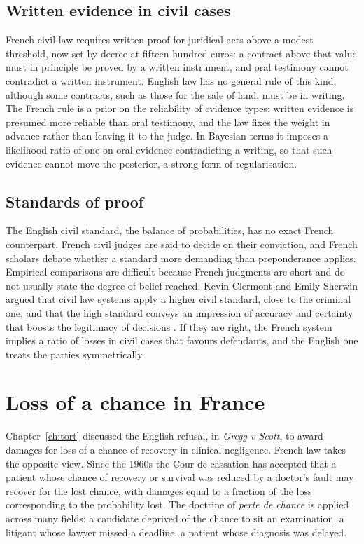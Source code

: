 \subsection{Written evidence in civil cases}

French civil law requires written proof for juridical acts above a modest threshold, now set by decree at fifteen hundred euros: a contract above that value must in principle be proved by a written instrument, and oral testimony cannot contradict a written instrument. English law has no general rule of this kind, although some contracts, such as those for the sale of land, must be in writing. The French rule is a prior on the reliability of evidence types: written evidence is presumed more reliable than oral testimony, and the law fixes the weight in advance rather than leaving it to the judge. In Bayesian terms it imposes a likelihood ratio of one on oral evidence contradicting a writing, so that such evidence cannot move the posterior, a strong form of regularisation.

\subsection{Standards of proof}

The English civil standard, the balance of probabilities, has no exact French counterpart. French civil judges are said to decide on their conviction, and French scholars debate whether a standard more demanding than preponderance applies. Empirical comparisons are difficult because French judgments are short and do not usually state the degree of belief reached. Kevin Clermont and Emily Sherwin argued that civil law systems apply a higher civil standard, close to the criminal one, and that the high standard conveys an impression of accuracy and certainty that boosts the legitimacy of decisions \citep{clermont2002}. If they are right, the French system implies a ratio of losses in civil cases that favours defendants, and the English one treats the parties symmetrically.

\section{Loss of a chance in France}

Chapter~\ref{ch:tort} discussed the English refusal, in \emph{Gregg v Scott}, to award damages for loss of a chance of recovery in clinical negligence. French law takes the opposite view. Since the 1960s the Cour de cassation has accepted that a patient whose chance of recovery or survival was reduced by a doctor's fault may recover for the lost chance, with damages equal to a fraction of the loss corresponding to the probability lost. The doctrine of \emph{perte de chance} is applied across many fields: a candidate deprived of the chance to sit an examination, a litigant whose lawyer missed a deadline, a patient whose diagnosis was delayed.

